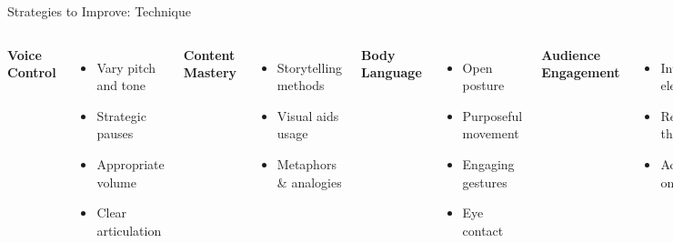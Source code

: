\documentclass{beamer}
\begin{document}
\begin{frame}{Strategies to Improve: Technique}
    \begin{columns}
        \textbf{Voice Control}
        \begin{itemize}
            \item Vary pitch and tone
            \item Strategic pauses
            \item Appropriate volume
            \item Clear articulation
        \end{itemize}
        
        \textbf{Content Mastery}
        \begin{itemize}
            \item Storytelling methods
            \item Visual aids usage
            \item Metaphors \& analogies
        \end{itemize}
        
        \textbf{Body Language}
        \begin{itemize}
            \item Open posture
            \item Purposeful movement
            \item Engaging gestures
            \item Eye contact
        \end{itemize}
        
        \textbf{Audience Engagement}
        \begin{itemize}
            \item Interactive elements
            \item Reading the room
            \item Adapting on the fly
        \end{itemize}
    \end{columns}
\end{frame}
\end{document}
